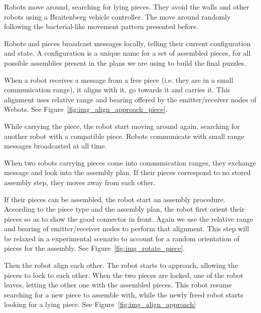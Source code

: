 		
		\begin{my_itemize}
			\item Robots move around, searching for lying pieces. They avoid the walls and other robots using a Braitenberg vehicle controller. The move around randomly following the bacterial-like movement pattern presented before.
			\item Robots and pieces broadcast messages locally, telling their current configuration and state. A configuration is a unique name for a set of assembled pieces, for all possible assemblies present in the plans we are using to build the final puzzles.
			\item When a robot receives a message from a free piece (i.e. they are in a small communication range), it aligns with it, go towards it and carries it. This alignment uses relative range and bearing offered by the emitter/receiver nodes of Webots. See Figure~\ref{fig:img_align_approach_piece}.
			\item While carrying the piece, the robot start moving around again, searching for another robot with a compatible piece. Robots communicate with small range messages broadcasted at all time.
			\item When two robots carrying pieces come into communication ranges, they exchange message and look into the assembly plan. If their pieces correspond to no stored assembly step, they moves away from each other. 
			\item If their pieces can be assembled, the robot start an assembly procedure. According to the piece type and the assembly plan, the robot first orient their pieces so as to show the good connector in front. Again we use the relative range and bearing of emitter/receiver nodes to perform that alignment. This step will be relaxed in a experimental scenario to account for a random orientation of pieces for the assembly. See Figure~\ref{fig:img_rotate_piece}.
			\item Then the robot align each other. The robot starts to approach, allowing the pieces to lock to each other. When the two pieces are locked, one of the robot leaves, letting the other one with the assembled pieces. This robot resume searching for a new piece to assemble with, while the newly freed robot starts looking for a lying piece. See Figure~\ref{fig:img_align_approach}
		\end{my_itemize}
		
	
	
